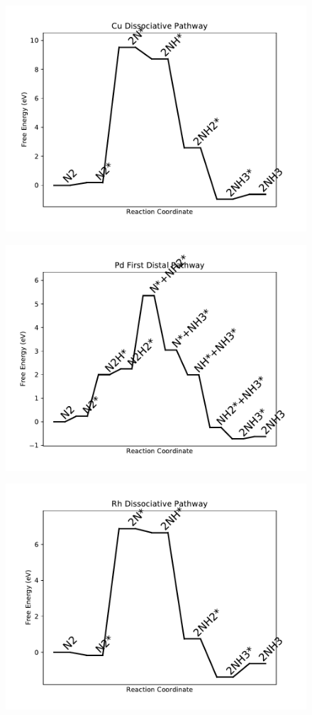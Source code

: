 \begin{figure}
\includegraphics[width=0.8\linewidth]{data/plots/Cu_dissociative.pdf}
\end{figure}

\begin{figure}
\includegraphics[width=0.8\linewidth]{data/plots/Pd_distal_1.pdf}
\end{figure}

\begin{figure}
\includegraphics[width=0.8\linewidth]{data/plots/Rh_dissociative.pdf}
\end{figure}

